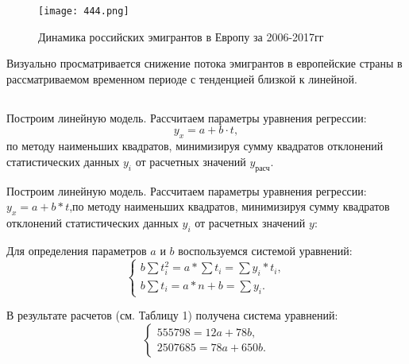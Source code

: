 \documentclass[a4paper,12pt]{article}
\begin{document}
\begin{figure}
    \centering
    \texttt{[image: 444.png]}
    \caption{Динамика российских эмигрантов в Европу за 2006-2017гг}
    \label{fig:enter-label}
\end{figure}

Визуально просматривается снижение потока эмигрантов в европейские страны в рассматриваемом временном периоде с тенденцией близкой к линейной.
\subsection*{}
Построим линейную модель. Рассчитаем параметры уравнения регрессии:
\[
y_x = a + b \cdot t,
\]
по методу наименьших квадратов, минимизируя сумму квадратов отклонений статистических данных \( y_i \) от расчетных значений \( y_{\text{расч}} \).

Построим линейную модель. Рассчитаем параметры уравнения
регрессии:$y_x=a+b*t$,по методу наименьших квадратов, минимизируя сумму
квадратов отклонений статистических данных $y_i$ от расчетных значений $y$:


Для определения параметров $a$ и $b$ воспользуемся системой уравнений:
\[
\begin{cases}
    b\sum t^2_i = a *\sum t_i = \sum y_i*t_i, \\
    b\sum t_i = a* n + b= \sum y_i.
\end{cases}
\]

В результате расчетов (см. Таблицу 1) получена система уравнений:
\[
\begin{cases}
    555798 = 12a + 78b, \\
    2507685 = 78a + 650b.
\end{cases}
\]
\end{document}
